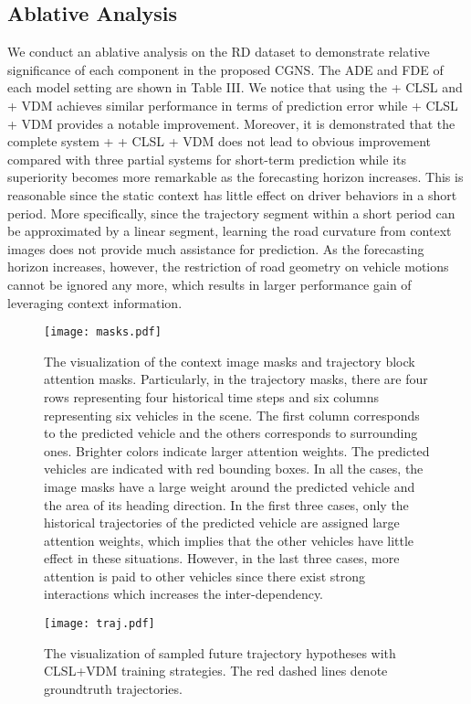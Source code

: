 \documentclass[letterpaper, 10 pt, conference]{ieeeconf}
\begin{document}
\subsection{Ablative Analysis}
We conduct an ablative analysis on the RD dataset to demonstrate relative significance of each component in the proposed CGNS. The ADE and FDE of each model setting are shown in Table III.
We notice that using the  + CLSL and  + VDM achieves similar performance in terms of prediction error while  + CLSL + VDM provides a notable improvement. 
Moreover, it is demonstrated that the complete system  +  + CLSL + VDM does not lead to obvious improvement compared with three partial systems for short-term prediction while its superiority becomes more remarkable as the forecasting horizon increases. This is reasonable since the static context has little effect on driver behaviors in a short period.
More specifically, since the trajectory segment within a short period can be approximated by a linear segment, learning the road curvature from context images does not provide much assistance for prediction. As the forecasting horizon increases, however, the restriction of road geometry on vehicle motions cannot be ignored any more, which results in larger performance gain of leveraging context information.
\begin{figure*}[!tbp]
	\centering
	\texttt{[image: masks.pdf]}
	\caption{The visualization of the context image masks and trajectory block attention masks. Particularly, in the trajectory masks, there are four rows representing four historical time steps and six columns representing six vehicles in the scene. The first column corresponds to the predicted vehicle and the others corresponds to surrounding ones. Brighter colors indicate larger attention weights. The predicted vehicles are indicated with red bounding boxes. In all the cases, the image masks have a large weight around the predicted vehicle and the area of its heading direction. In the first three cases, only the historical trajectories of the predicted vehicle are assigned large attention weights, which implies that the other vehicles have little effect in these situations. However, in the last three cases, more attention is paid to other vehicles since there exist strong interactions which increases the inter-dependency.}
\end{figure*}
\begin{figure}[!tbp]
	\centering
	\texttt{[image: traj.pdf]}
	\caption{The visualization of sampled future trajectory hypotheses with CLSL+VDM training strategies. The red dashed lines denote groundtruth trajectories.}
\end{figure}
\end{document}
